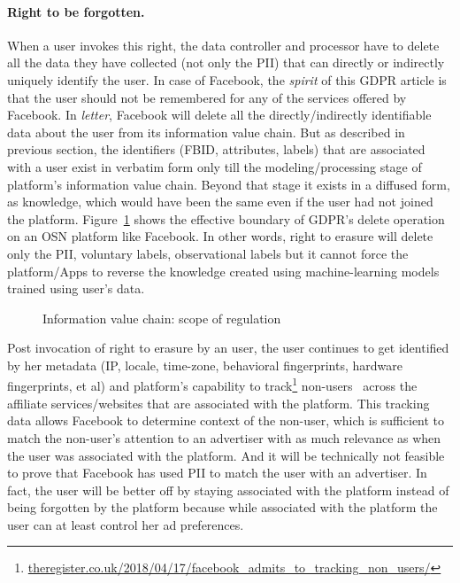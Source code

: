\documentclass[runningheads]{llncs}
\begin{document}
\paragraph{Right to be forgotten.} When a user invokes this right, the
data controller and processor have to delete all the data they have
collected (not only the PII) that can directly or indirectly uniquely
identify the user. In case of Facebook, the \textit{spirit} of this
GDPR article is that the user should not be remembered for any of the
services offered by Facebook. In \textit{letter}, Facebook will delete
all the directly/indirectly identifiable data about the user from its
information value chain. But as described in previous section, the
identifiers (FBID, attributes, labels) that are associated with a user
exist in verbatim form only till the modeling/processing stage of
platform's information value chain. Beyond that stage it exists in a
diffused form, as knowledge, which would have been the same even if
the user had not joined the platform. Figure~\ref{fig:data-governance}
shows the effective boundary of GDPR's delete operation on an OSN
platform like Facebook. In other words, right to erasure will delete
only the PII, voluntary labels, observational labels but it cannot
force the platform/Apps to reverse the knowledge created using
machine-learning models trained using user's data.
%
\begin{figure}[!h]
  \centering
  {}
  \caption{Information value chain: scope of regulation}
  \label{fig:data-governance}
\end{figure}

Post invocation of right to erasure by an user, the user continues to
get identified by her metadata (IP, locale, time-zone, behavioral
fingerprints, hardware fingerprints, et al) and platform's capability
to
track\footnote{\href{https://www.theregister.co.uk/2018/04/17/facebook_admits_to_tracking_non_users/}{theregister.co.uk/2018/04/17/facebook\_admits\_to\_tracking\_non\_users/}}
non-users~\cite{social-plugins,web-never-forgets} across the affiliate
services/websites that are associated with the platform. This tracking
data allows Facebook to determine context of the non-user, which is
sufficient to match the non-user's attention to an advertiser with as
much relevance as when the user was associated with the platform. And
it will be technically not feasible to prove that Facebook has used
PII to match the user with an advertiser. In fact, the user will be
better off by staying associated with the platform instead of being
forgotten by the platform because while associated with the platform
the user can at least control her ad preferences.
\end{document}
